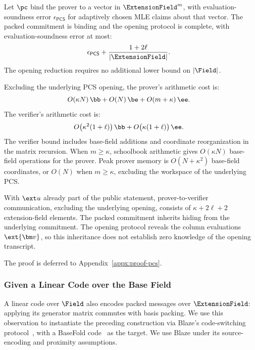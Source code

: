 \begin{proposition}
\label{proposition:packed-pcs}
Let \(\pc\) bind the prover to a vector in \(\ExtensionField^m\),
with evaluation-soundness error \(\epsilon_{\mathsf{PCS}}\) for
adaptively chosen MLE claims about that vector.
The packed commitment is binding and the opening protocol is
complete, with evaluation-soundness error at most:
\begin{equation}
    \epsilon_{\mathsf{PCS}}
    +\frac{1+2\ell}{|\ExtensionField|}.
\label{eq:pcs-soundness}
\end{equation}
The opening reduction requires no additional lower bound on
\(|\Field|\).

Excluding the underlying PCS opening, the prover's arithmetic cost is:
\begin{equation}
    O(\kappa N)\,\bb
    +O(N)\,\be
    +O(m+\kappa)\,\ee.
\label{eq:pcs-prover-cost}
\end{equation}
The verifier's arithmetic cost is:
\begin{equation}
    O\bigl(\kappa^2(1+\ell)\bigr)\,\bb
    +O\bigl(\kappa(1+\ell)\bigr)\,\ee.
\label{eq:pcs-verifier-cost}
\end{equation}
The verifier bound includes base-field additions and coordinate
reorganization in the matrix recursion.
When \(m\geq\kappa\), schoolbook arithmetic gives
\(O(\kappa N)\) base-field operations for the prover.
Peak prover memory is \(O(N+\kappa^2)\) base-field coordinates,
or \(O(N)\) when \(m\geq\kappa\), excluding the workspace of the
underlying PCS.

With \(\ext u\) already part of the public statement,
prover-to-verifier communication, excluding the underlying
opening, consists of \(\kappa+2\ell+2\) extension-field elements.
The packed commitment inherits hiding from the underlying
commitment. The opening protocol reveals the column evaluations
\(\ext{\bm v}\), so this inheritance does not establish
zero knowledge of the opening transcript.
\end{proposition}

The proof is deferred to Appendix~\ref{appx:proof-pcs}.

\subsubsection{Given a Linear Code over the Base Field}

A linear code over \(\Field\) also encodes packed messages over
\(\ExtensionField\): applying its generator matrix commutes with
basis packing. We use this observation to instantiate the preceding
construction via Blaze's code-switching
protocol~\cite{eurocrypt/BrehmCFRRZ25}, with a BaseFold
code~\cite{crypto/ZeilbergerCF24} as the target. We use Blaze under
its source-encoding and proximity assumptions.

